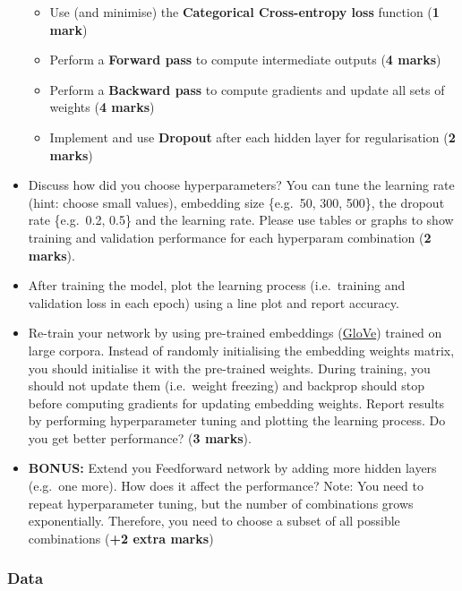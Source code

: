 \documentclass[11pt]{article}
\providecommand{\tightlist}{%
      \setlength{\itemsep}{0pt}\setlength{\parskip}{0pt}}
\begin{document}
\begin{itemize}
  \begin{itemize}
  \tightlist
  \item
    Use (and minimise) the \textbf{Categorical Cross-entropy loss}
    function (\textbf{1 mark})
  \item
    Perform a \textbf{Forward pass} to compute intermediate outputs
    (\textbf{4 marks})
  \item
    Perform a \textbf{Backward pass} to compute gradients and update all
    sets of weights (\textbf{4 marks})
  \item
    Implement and use \textbf{Dropout} after each hidden layer for
    regularisation (\textbf{2 marks})
  \end{itemize}
\item
  Discuss how did you choose hyperparameters? You can tune the learning
  rate (hint: choose small values), embedding size \{e.g.~50, 300,
  500\}, the dropout rate \{e.g.~0.2, 0.5\} and the learning rate.
  Please use tables or graphs to show training and validation
  performance for each hyperparam combination (\textbf{2 marks}).
\item
  After training the model, plot the learning process (i.e.~training and
  validation loss in each epoch) using a line plot and report accuracy.
\item
  Re-train your network by using pre-trained embeddings
  (\href{https://nlp.stanford.edu/projects/glove/}{GloVe}) trained on
  large corpora. Instead of randomly initialising the embedding weights
  matrix, you should initialise it with the pre-trained weights. During
  training, you should not update them (i.e.~weight freezing) and
  backprop should stop before computing gradients for updating embedding
  weights. Report results by performing hyperparameter tuning and
  plotting the learning process. Do you get better performance?
  (\textbf{3 marks}).
\item
  \textbf{BONUS:} Extend you Feedforward network by adding more hidden
  layers (e.g.~one more). How does it affect the performance? Note: You
  need to repeat hyperparameter tuning, but the number of combinations
  grows exponentially. Therefore, you need to choose a subset of all
  possible combinations (\textbf{+2 extra marks})
\end{itemize}

\hypertarget{data}{%
\subsubsection{Data}\label{data}}
\end{document}
